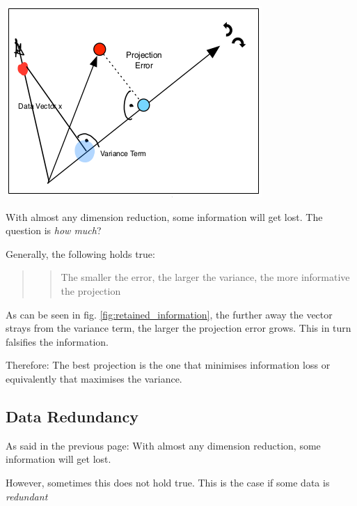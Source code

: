 \documentclass[11pt]{article}
\begin{document}
\begin{minipage}{0.45\textwidth}
    \includegraphics[keepaspectratio=true,height=11\baselineskip]{retained_information.png}
    \label{fig:retained_information}
\end{minipage} \hfill
\begin{minipage}{0.45\textwidth}
    With almost any dimension reduction, some information will get lost. The question is \textit{how much}?

    Generally, the following holds true:

    \begin{quote}
        \blockquote{The smaller the error, the larger the variance, the more informative the projection}
    \end{quote}

    As can be seen in fig. \ref{fig:retained_information}, the further away the vector strays from the variance term, the larger the projection error grows. This in turn falsifies the information.

    Therefore: The best projection is the one that minimises information loss or equivalently that maximises the variance.
\end{minipage}

\subsection{Data Redundancy}

As said in the previous page: With almost any dimension reduction, some information will get lost.

However, sometimes this does not hold true. This is the case if some data is \textit{redundant}

\vspace{10px}
\end{document}
